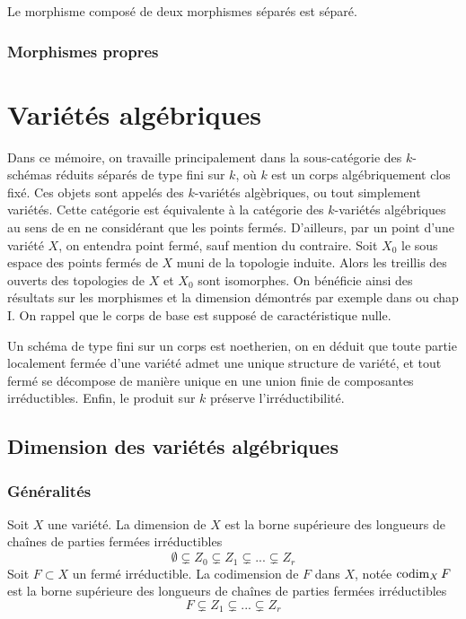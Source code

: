 \begin{prop}\label{sepCritere2}
Le morphisme composé de deux morphismes séparés est séparé.
\end{prop}


\subsubsection{Morphismes propres}


\section{Variétés algébriques}

Dans ce mémoire, on travaille principalement dans la sous-catégorie des $k$-schémas réduits séparés de type fini sur $k$, où $k$ est un corps algébriquement clos fixé. Ces objets sont appelés des $k$-variétés algèbriques, ou tout simplement variétés.  Cette catégorie est équivalente à la catégorie des $k$-variétés algébriques au sens de \cite{LAGSpringer} en ne considérant que les points fermés. D'ailleurs, par un point d'une variété $X$, on entendra point fermé, sauf mention du contraire. Soit $X_0$ le sous espace des points fermés de $X$ muni de la topologie induite. Alors les treillis des ouverts des topologies de $X$ et $X_0$ sont isomorphes. On bénéficie ainsi des résultats sur les morphismes et la dimension démontrés par exemple dans \cite{LAGSpringer} ou \cite{MumfordRedBook} chap I. On rappel que le corps de base est supposé de caractéristique nulle.

Un schéma de type fini sur un corps est noetherien, on en déduit que toute partie localement fermée d'une variété admet une unique structure de variété, et tout fermé se décompose de manière unique en une union finie de composantes irréductibles. Enfin, le produit sur $k$ préserve l'irréductibilité.

\subsection{Dimension des variétés algébriques}

\subsubsection{Généralités}

\begin{defn}
Soit $X$ une variété. La dimension de $X$ est la borne supérieure des longueurs de chaînes de parties fermées irréductibles
$$\emptyset \varsubsetneq Z_0 \varsubsetneq Z_1 \varsubsetneq ... \varsubsetneq Z_r$$
Soit $F\subset X$ un fermé irréductible. La codimension de $F$ dans $X$, notée $\operatorname{codim}_X F$ est la borne supérieure des longueurs de chaînes de parties fermées irréductibles
$$F \varsubsetneq Z_1 \varsubsetneq ... \varsubsetneq Z_r$$
\end{defn}

